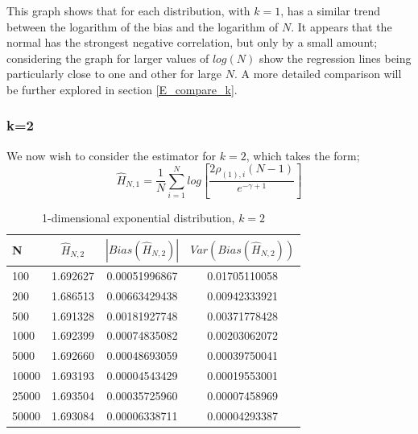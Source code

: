 \documentclass{article}
\begin{document}
This graph shows that for each distribution, with $k=1$, has a similar trend between the logarithm of the bias and the logarithm of $N$. It appears that the normal has the strongest negative correlation, but only by a small amount; considering the graph for larger values of $log(N)$ show the regression lines being particularly close to one and other for large $N$. A more detailed comparison will be further explored in section \ref{E_compare_k}.





\subsubsection{k=2} \label{E_k=2}
We now wish to consider the estimator for $k=2$, which takes the form;
\begin{equation} 
\hat{H}_{N, 1} = \frac{1}{N} \sum_{i=1}^{N} log \left[ \frac{2\rho_{(1),i} (N-1)}{e^{-\gamma + 1}} \right] \nonumber
\end{equation}

\begin{table}
\caption{1-dimensional exponential distribution, $k=2$} \label{expo_k=2_table}
\begin{center}
\begin{tabular}{| l | c c c|} 
\toprule
N & $\hat{H}_{N, 2}$ & $|Bias(\hat{H}_{N, 2})|$ & $Var(Bias(\hat{H}_{N, 2}))$ \\
\midrule[1pt]
100     & 1.692627     & 0.00051996867     & 0.01705110058  \\
200     & 1.686513     & 0.00663429438     & 0.00942333921  \\
500     & 1.691328     & 0.00181927748     & 0.00371778428  \\
1000    & 1.692399     & 0.00074835082     & 0.00203062072  \\
5000    & 1.692660     & 0.00048693059     & 0.00039750041  \\
10000   & 1.693193     & 0.00004543429     & 0.00019553001  \\
25000   & 1.693504     & 0.00035725960     & 0.00007458969  \\
50000   & 1.693084     & 0.00006338711     & 0.00004293387  \\
\hline
\end{tabular}
\end{center}
\end{table}
\end{document}
